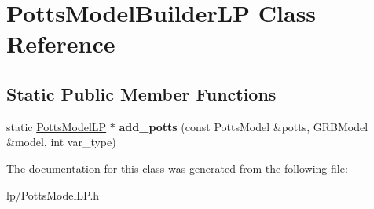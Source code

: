 \hypertarget{class_potts_model_builder_l_p}{
\section{PottsModelBuilderLP Class Reference}
\label{class_potts_model_builder_l_p}
}
\subsection*{Static Public Member Functions}
\begin{DoxyCompactItemize}
\item 
\hypertarget{class_potts_model_builder_l_p_af62f78dc2bdeb5b4d39444c47f8ad341}{
static \hyperlink{struct_potts_model_l_p}{PottsModelLP} $\ast$ {\bfseries add\_\-potts} (const PottsModel \&potts, GRBModel \&model, int var\_\-type)}
\label{class_potts_model_builder_l_p_af62f78dc2bdeb5b4d39444c47f8ad341}

\end{DoxyCompactItemize}


The documentation for this class was generated from the following file:\begin{DoxyCompactItemize}
\item 
lp/PottsModelLP.h\end{DoxyCompactItemize}
